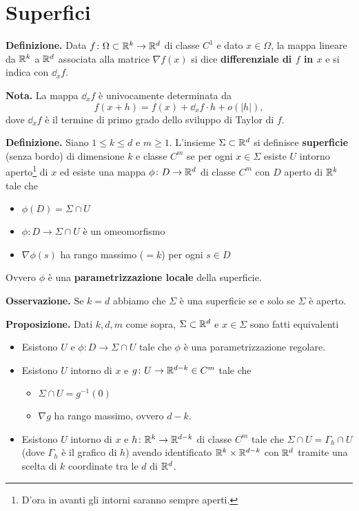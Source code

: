 \section{Superfici}

\textbf{Definizione.} Data $f \colon \Omega \subset \mathbb R^k \to \mathbb R^d$ di classe $C^1$ e dato $x \in \Omega$, la mappa lineare da $\mathbb R^k$ a $\mathbb R^d$ associata alla matrice $\nabla f(x)$ si dice \textbf{differenziale di $f$ in $x$} e si indica con $\dd_x f$.

\textbf{Nota.} La mappa $\dd_x f$ è univocamente determinata  da
%
$$
	f(x+h) = f(x) + \dd_x f \cdot h + o(|h|),
$$
%
dove $\dd_x f$ è il termine di primo grado dello sviluppo di Taylor di $f$.

\textbf{Definizione.} Siano $1 \leq k \leq d$ e $m \geq 1$. L'insieme $\Sigma \subset \mathbb R^d$ si definisce \textbf{superficie} (senza bordo) di dimensione $k$ e classe $C^m$ se per ogni $x \in \Sigma$ esiste $U$ intorno aperto\footnote{D'ora in avanti gli intorni saranno sempre aperti.} di $x$ ed esiste una mappa $\phi \colon D \to \mathbb R^d$  di classe $C^m$ con $D$ aperto di $\mathbb R^k$ tale che
\begin{itemize}

	\item $\phi(D) = \Sigma \cap U$

	\item $\phi \colon D \to \Sigma \cap U$ è un omeomorfismo

	\item $\nabla \phi(s)$ ha rango massimo ($=k$) per ogni $s \in D$

\end{itemize}
Ovvero $\phi$ è una \textbf{parametrizzazione locale} della superficie.

\textbf{Osservazione.} Se $k = d$ abbiamo che $\Sigma$ è una superficie se e solo se $\Sigma$ è aperto.

\textbf{Proposizione.} Dati $k,d,m$ come sopra, $\Sigma \subset \mathbb R^d$ e $x \in \Sigma$ sono fatti equivalenti
\begin{itemize}

	\item Esistono $U$ e $\phi \colon D \to \Sigma \cap U$ tale che $\phi$ è una parametrizzazione regolare.


	\item Esistono $U$ intorno di $x$ e $g \colon U \to \mathbb R^{d-k} \in C^m$ tale che 
	\begin{itemize}

		\item $\Sigma \cap U = g^{-1}(0)$

		\item $\nabla g$ ha rango massimo, ovvero $d-k$.

	\end{itemize}


	\item Esistono $U$ intorno di $x$ e $h \colon \mathbb R^k \to \mathbb R^{d-k}$ di classe $C^m$ tale che $\Sigma \cap U = \Gamma_h \cap U$ (dove $\Gamma_h$ è il grafico di $h$) avendo identificato $\mathbb R^k \times \mathbb R^{d-k}$ con $\mathbb R^d$ tramite una scelta di $k$ coordinate tra le $d$ di $\mathbb R^d$.

\end{itemize}

